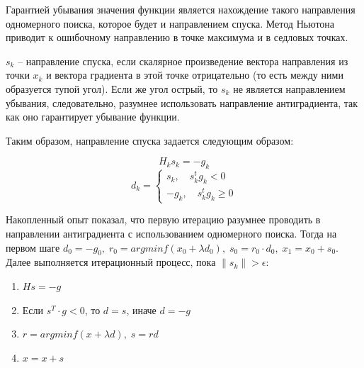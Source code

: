 \documentclass[12pt]{article}
\begin{document}
Гарантией убывания значения функции является нахождение такого направления одномерного поиска, которое будет и направлением спуска. Метод Ньютона приводит к ошибочному направлению в точке максимума и в седловых точках.

$s_k$ -- направление спуска, если скалярное произведение вектора направления из точки $x_k$ и вектора градиента в этой точке отрицательно (то есть между ними образуется тупой угол). Если же угол острый, то $s_k$ не является направлением убывания, следовательно, разумнее использовать направление антиградиента, так как оно гарантирует убывание функции.

Таким образом, направление спуска задается следующим образом:

\[ H_k s_k = -g_k \]
\[ d_k =
	\begin{cases}
		s_k, \quad s_k^t g_k < 0 \\
		-g_k, \quad s_k^t g_k \geq 0
	\end{cases}
\]

Накопленный опыт показал, что первую итерацию разумнее проводить в направлении антиградиента с использованием одномерного поиска. Тогда на первом шаге $d_0 = -g_0, \; r_0 = arg min f(x_0+\lambda d_0), \; s_0 = r_0 \cdot d_0, \; x_1 = x_0 + s_0$. Далее выполняется итерационный процесс, пока $\lVert s_k \rVert > \epsilon$:

\begin{enumerate}
 	\item $Hs = -g$
 	\item Если $s^T \cdot g < 0$, то $d = s$, иначе $d = -g$
 	\item $r = arg min f(x+\lambda d), \; s = rd$
 	\item $x = x + s$
\end{enumerate}
\end{document}
